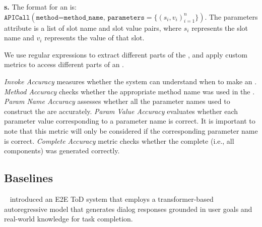 \noindent
\textbf{{\apicall}s.} 
The format for an {\apicall} is:
\(
\texttt{APICall}( \texttt{method=method\_name, parameters} = \{ (s_i,v_i)_{i=1}^n \} ).
\)
The parameters attribute is a list of slot name and slot value pairs, where $s_i$ represents the slot name and $v_i$ represents the value of that slot. 

We use regular expressions to extract different parts of the {\apicall}, and apply custom metrics to access different parts of an {\apicall}.

\textit{Invoke Accuracy} measures whether the system can understand when to make an \apicall.
 \textit{Method Accuracy} checks whether the appropriate method name was used in the \apicall.      
 \textit{Param Name Accuracy} assesses whether all the parameter names used to construct the {\apicall} are accurately.
 \textit{Param Value Accuracy} evaluates whether each parameter value corresponding to a parameter name is correct. It is important to note that this metric will only be considered if the corresponding parameter name is correct. 
 \textit{Complete {\apicall} Accuracy} metric checks whether the complete {\apicall} (i.e., all components) was generated correctly.



\vspace{-5pt}
\subsection{Baselines}
\vspace{-3pt}
\noindent
\textit{\soloist}~\cite{Peng2021SoloistBT} introduced an E2E ToD system that employs a transformer-based autoregressive model that generates dialog responses grounded in user goals and real-world knowledge for task completion.

